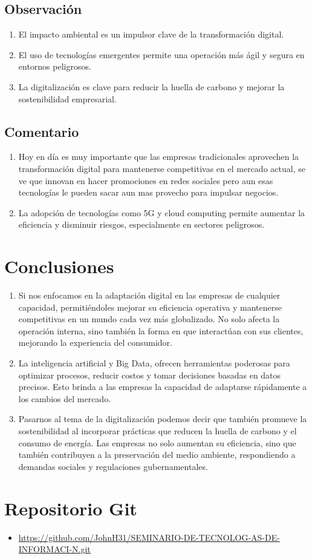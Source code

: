 \documentclass[12pt]{article}
\begin{document}
\subsection*{Observación}
\begin{enumerate}
    \item El impacto ambiental es un impulsor clave de la transformación digital. 
    \item El uso de tecnologías emergentes permite una operación más ágil y segura en entornos peligrosos.
    \item La digitalización es clave para reducir la huella de carbono y mejorar la sostenibilidad empresarial.
\end{enumerate}

\subsection*{Comentario}
\begin{enumerate}
    \item Hoy en día es muy importante que las empresas tradicionales aprovechen la transformación digital para mantenerse competitivas en el mercado actual, se ve que innovan en hacer promociones en redes sociales pero aun esas tecnologías le pueden sacar aun mas provecho para impulsar negocios. 
    \item La adopción de tecnologías como 5G y cloud computing permite aumentar la eficiencia y disminuir riesgos, especialmente en sectores peligrosos.
\end{enumerate}

\section*{Conclusiones}
\begin{enumerate}
    \item Si nos enfocamos en la adaptación digital en las empresas de cualquier capacidad, permitiéndoles mejorar su eficiencia operativa y mantenerse competitivas en un mundo cada vez más globalizado. No solo afecta la operación interna, sino también la forma en que interactúan con sus clientes, mejorando la experiencia del consumidor.
    \item La inteligencia artificial y Big Data, ofrecen herramientas poderosas para optimizar procesos, reducir costos y tomar decisiones basadas en datos precisos. Esto brinda a las empresas la capacidad de adaptarse rápidamente a los cambios del mercado.
    \item Pasarnos al tema de la digitalización podemos decir que también promueve la sostenibilidad al incorporar prácticas que reducen la huella de carbono y el consumo de energía. Las empresas no solo aumentan su eficiencia, sino que también contribuyen a la preservación del medio ambiente, respondiendo a demandas sociales y regulaciones gubernamentales.
\end{enumerate}




\section*{Repositorio Git}
\begin{itemize}
    \item \url{https://github.com/JohnH31/SEMINARIO-DE-TECNOLOG-AS-DE-INFORMACI-N.git}
\end{itemize}
\end{document}

